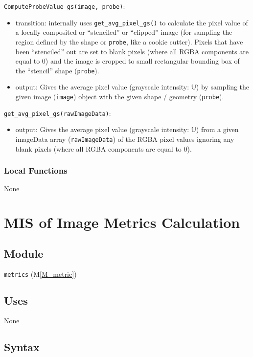 \documentclass[12pt, titlepage]{article}
\newcommand{\mref}[1]{M\ref{#1}}
\newcommand{\mrefp}[1]{(\mref{#1})}
\newcommand{\code}[1]{\texttt{#1}}
\begin{document}
\noindent \code{ComputeProbeValue\_gs(image, probe)}:
\begin{itemize}
\item transition: internally uses \code{get\_avg\_pixel\_gs()} to calculate the pixel value
  of a locally composited or ``stenciled'' or ``clipped'' image (for sampling the region
  defined by the shape or \code{probe}, like a cookie cutter).
  Pixels that have been ``stenciled'' out are set to blank pixels (where all RGBA components are equal to 0)
  and the image is cropped to small rectangular bounding box of the ``stencil'' shape (\code{probe}).
\item output: Gives the average pixel value (grayscale intensity: $\mathbb{U}$) by sampling the given image
  (\code{image}) object with the given shape / geometry (\code{probe}).
\end{itemize}

\noindent \code{get\_avg\_pixel\_gs(rawImageData)}:
\begin{itemize}
  \item output: Gives the average pixel value (grayscale intensity: $\mathbb{U}$) from a given imageData
  array (\code{rawImageData}) of the RGBA pixel values ignoring
  any blank pixels (where all RGBA components are equal to 0).
\end{itemize}

\subsubsection{Local Functions}
None

\newpage



\section{MIS of Image Metrics Calculation} \label{MS_metrics}

\subsection{Module}
\code{metrics} \mrefp{M_metric}

\subsection{Uses}
None

\subsection{Syntax}
\end{document}
